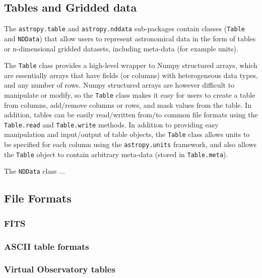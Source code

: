 \documentclass[traditabstract]{aa}
\begin{document}
\subsection{Tables and Gridded data}


\label{sec:table}

The \texttt{astropy.table} and \texttt{astropy.nddata} sub-packages contain
classes (\texttt{Table} and \texttt{NDData}) that allow users to represent
astronomical data in the form of tables or n-dimensional gridded datasets,
including meta-data (for example units).

The \texttt{Table} class provides a high-level wrapper to Numpy structured
arrays, which are essentially arrays that have fields (or columns) with
heterogeneous data types, and any number of rows. Numpy structured arrays are
however difficult to manipulate or modify, so the \texttt{Table} class makes
it easy for users to create a table from columns, add/remove columns or rows,
and mask values from the table. In addition, tables can be easily
read/written from/to common file formats using the \texttt{Table.read} and
\texttt{Table.write} methods. In addition to providing easy manipulation and
input/output of table objects, the \texttt{Table} class allows units to be
specified for each column using the \texttt{astropy.units} framework, and
also allows the \texttt{Table} object to contain arbitrary meta-data (stored
in \texttt{Table.meta}).


The \texttt{NDData} class ...

\subsection{File Formats}


\subsubsection{FITS}



\subsubsection{ASCII table formats}



\subsubsection{Virtual Observatory tables}
\end{document}
